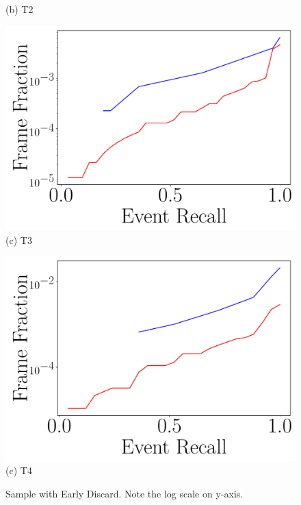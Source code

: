 \begin{figure}[h]
\begin{minipage}[]{0.47\linewidth}
{(b) T2}
\end{minipage}
\begin{minipage}[]{0.47\linewidth}
\centering
\includegraphics[trim={0.5cm 0.5cm 0 0},clip,width=\linewidth]{FIGS/fig-random-select-and-filter-recall-frame-raft-aggregated.pdf}
{(c) T3}
\end{minipage}
\begin{minipage}[]{0.47\linewidth}
\centering
\includegraphics[trim={0.5cm 0.5cm 0 0},clip,width=\linewidth]{FIGS/fig-random-select-and-filter-recall-frame-elephant-aggregated.pdf}
{(c) T4}
\end{minipage}
\caption{Sample with Early Discard. Note the log scale on y-axis.}
\label{fig:sampling-discard}
\end{figure}

